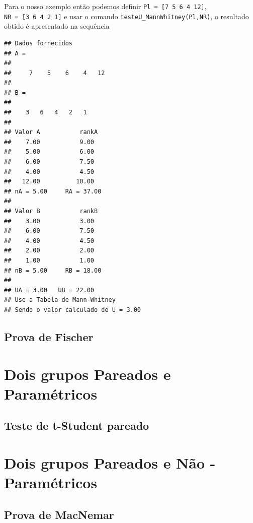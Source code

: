 \documentclass[
]{book}
\begin{document}
Para o nosso exemplo então podemos definir \texttt{Pl\ =\ {[}7\ 5\ 6\ 4\ 12{]}}, \texttt{NR\ =\ {[}3\ 6\ 4\ 2\ 1{]}} e usar o comando \texttt{testeU\_MannWhitney(Pl,NR)}, o resultado obtido é apresentado na sequência

\begin{verbatim}
## Dados fornecidos
## A =
## 
##     7    5    6    4   12
## 
## B =
## 
##    3   6   4   2   1
## 
## Valor A           rankA
##    7.00           9.00
##    5.00           6.00
##    6.00           7.50
##    4.00           4.50
##   12.00          10.00
## nA = 5.00     RA = 37.00
## 
## Valor B           rankB
##    3.00           3.00
##    6.00           7.50
##    4.00           4.50
##    2.00           2.00
##    1.00           1.00
## nB = 5.00     RB = 18.00
## 
## UA = 3.00   UB = 22.00
## Use a Tabela de Mann-Whitney
## Sendo o valor calculado de U = 3.00
\end{verbatim}

\hypertarget{prova-de-fischer}{%
\section{Prova de Fischer}\label{prova-de-fischer}}

\hypertarget{dois-grupos-pareados-e-paramuxe9tricos}{%
\chapter{Dois grupos Pareados e Paramétricos}\label{dois-grupos-pareados-e-paramuxe9tricos}}

\hypertarget{teste-de-t-student-pareado}{%
\section{Teste de t-Student pareado}\label{teste-de-t-student-pareado}}

\hypertarget{dois-grupos-pareados-e-nuxe3o---paramuxe9tricos}{%
\chapter{Dois grupos Pareados e Não - Paramétricos}\label{dois-grupos-pareados-e-nuxe3o---paramuxe9tricos}}

\hypertarget{prova-de-macnemar}{%
\section{Prova de MacNemar}\label{prova-de-macnemar}}
\end{document}
